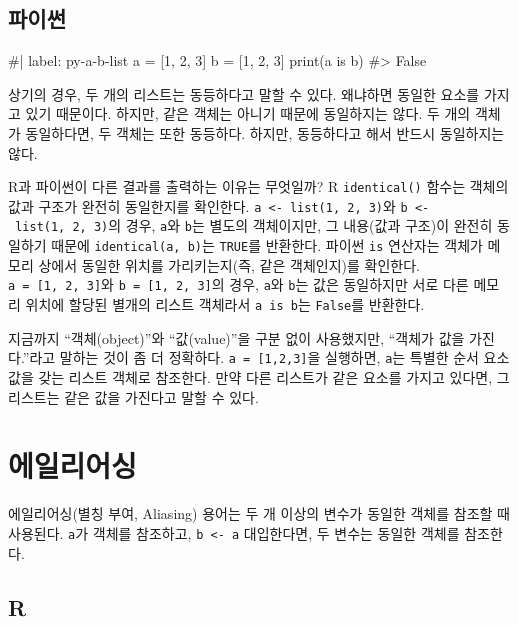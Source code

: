 \documentclass[
  letterpaper,
]{book}
\newenvironment{Shaded}{\begin{snugshade}}{\end{snugshade}}
\newcommand{\NormalTok}[1]{\textcolor[rgb]{0.00,0.23,0.31}{#1}}
\begin{document}
\subsection{파이썬}

\begin{Shaded}
\begin{Highlighting}[]
\NormalTok{\#| label: py{-}a{-}b{-}list}
\NormalTok{a = [1, 2, 3]}
\NormalTok{b = [1, 2, 3]}
\NormalTok{print(a is b)}
\NormalTok{\#\textgreater{} False}
\end{Highlighting}
\end{Shaded}

상기의 경우, 두 개의 리스트는 동등하다고 말할 수 있다. 왜냐하면 동일한
요소를 가지고 있기 때문이다. 하지만, 같은 객체는 아니기 때문에
동일하지는 않다. 두 개의 객체가 동일하다면, 두 객체는 또한 동등하다.
하지만, 동등하다고 해서 반드시 동일하지는 않다. 

R과 파이썬이 다른 결과를 출력하는 이유는 무엇일까? R
\texttt{identical()} 함수는 객체의 값과 구조가 완전히 동일한지를
확인한다. \texttt{a\ \textless{}-\ list(1,\ 2,\ 3)}와
\texttt{b\ \textless{}-\ list(1,\ 2,\ 3)}의 경우, \texttt{a}와
\texttt{b}는 별도의 객체이지만, 그 내용(값과 구조)이 완전히 동일하기
때문에 \texttt{identical(a,\ b)}는 \texttt{TRUE}를 반환한다. 파이썬
\texttt{is} 연산자는 객체가 메모리 상에서 동일한 위치를 가리키는지(즉,
같은 객체인지)를 확인한다. \texttt{a\ =\ {[}1,\ 2,\ 3{]}}와
\texttt{b\ =\ {[}1,\ 2,\ 3{]}}의 경우, \texttt{a}와 \texttt{b}는 값은
동일하지만 서로 다른 메모리 위치에 할당된 별개의 리스트 객체라서
\texttt{a\ is\ b}는 \texttt{False}를 반환한다.

지금까지 ``객체(object)''와 ``값(value)''을 구분 없이 사용했지만,
``객체가 값을 가진다.''라고 말하는 것이 좀 더 정확하다.
\texttt{a\ =\ {[}1,2,3{]}}을 실행하면, \texttt{a}는 특별한 순서 요소
값을 갖는 리스트 객체로 참조한다. 만약 다른 리스트가 같은 요소를 가지고
있다면, 그 리스트는 같은 값을 가진다고 말할 수 있다. 

\section{에일리어싱}\label{r-list-aliasing}

에일리어싱(별칭 부여, Aliasing) 용어는 두 개 이상의 변수가 동일한 객체를
참조할 때 사용된다. \texttt{a}가 객체를 참조하고,
\texttt{b\ \textless{}-\ a} 대입한다면, 두 변수는 동일한 객체를
참조한다.  

\subsection{R}
\end{document}

